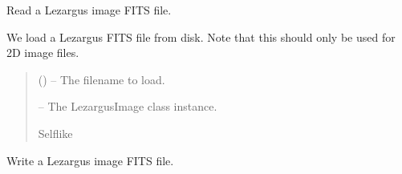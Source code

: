 \documentclass[letterpaper,11pt,english]{sphinxmanual}
\begin{document}
\begin{savenotes}
\begin{fulllineitems}

\begin{savenotes}\begin{fulllineitems}
\label{\detokenize{code/lezargus.container.image:lezargus.container.image.LezargusImage.read_fits_file}}
\pysigstartsignatures
{}
\pysigstopsignatures
\sphinxAtStartPar
Read a Lezargus image FITS file.

\sphinxAtStartPar
We load a Lezargus FITS file from disk. Note that this should only
be used for 2\sphinxhyphen{}D image files.
\begin{quote}\begin{description}
\sphinxAtStartPar
{} () – The filename to load.

\sphinxAtStartPar
{} – The LezargusImage class instance.

\sphinxAtStartPar
Self\sphinxhyphen{}like

\end{description}\end{quote}

\end{fulllineitems}\end{savenotes}


\begin{savenotes}\begin{fulllineitems}
\label{\detokenize{code/lezargus.container.image:lezargus.container.image.LezargusImage.write_fits_file}}
\pysigstartsignatures
{}
\pysigstopsignatures
\sphinxAtStartPar
Write a Lezargus image FITS file.


\end{fulllineitems}
\end{savenotes}
\end{fulllineitems}
\end{savenotes}
\end{document}
